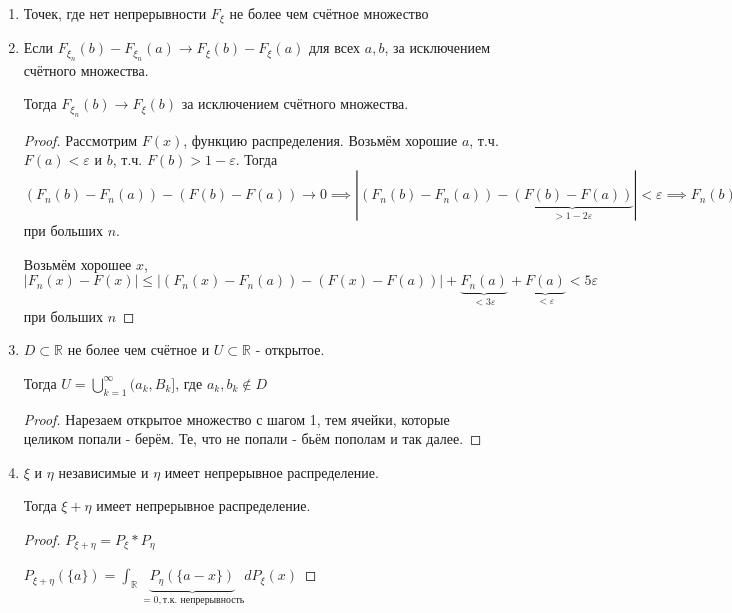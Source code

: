 \begin{remark}
    \begin{enumerate}
        \item {
            Точек, где нет непрерывности $F_{\xi}$ не более чем счётное множество

        }
        \item {
            Если $F_{\xi_n}(b) - F_{\xi_n} (a) \rightarrow F_{\xi}(b) - F_{\xi}(a)$ для всех $a, b$, за исключением счётного множества.
            
            Тогда $F_{\xi_n}(b) \rightarrow F_{\xi} (b)$ за исключением счётного множества.

            \begin{proof}
                Рассмотрим $F(x)$, функцию распределения. Возьмём хорошие $a$, т.ч. $F(a) < \varepsilon$ и 
                $b$, т.ч. $F(b) > 1 - \varepsilon$. Тогда $(F_n(b) - F_n (a)) - (F(b) - F(a)) \rightarrow 0 \implies 
                |(F_n(b) - F_n(a)) - \underbrace{(F(b) - F(a))}_{> 1 - 2\varepsilon}| < \varepsilon \implies F_n(b) - F_n(a) > 1 - 3\varepsilon \implies F_n(a) < 3\varepsilon$ при больших $n$.

                Возьмём хорошее $x$, $|F_n(x) - F(x)| \leqslant |(F_n(x) - F_n(a)) - (F(x) - F(a))| + \underbrace{F_n(a)}_{<3\varepsilon} + \underbrace{F(a)}_{<\varepsilon} < 5\varepsilon$ при больших $n$
            \end{proof}
        }
        \item {
            $D \subset \mathbb{R}$ не более чем счётное и $U \subset \mathbb{R}$ - открытое.

            Тогда $U = \bigcup_{k = 1}^{\infty} (a_k, B_k]$, где $a_k, b_k \not \in D$

            \begin{proof}
                Нарезаем открытое множество с шагом 1, тем ячейки, которые целиком попали - берём. Те, что не попали - бьём пополам и так далее.
            \end{proof}
        }
        \item {
            $\xi$ и $\eta$ независимые и $\eta$ имеет непрерывное распределение.

            Тогда $\xi + \eta$ имеет непрерывное распределение.

            \begin{proof}
                $P_{\xi + \eta} = P_{\xi} * P_{\eta}$

                $P_{\xi + \eta} (\{ a \}) = \int_{\mathbb{R}} \underbrace{P_{\eta} ( \{ a - x \} )}_{= 0, \text{т.к. непрерывность}}  dP_{\xi} (x) $
            \end{proof}
        }
    \end{enumerate}
\end{remark}

